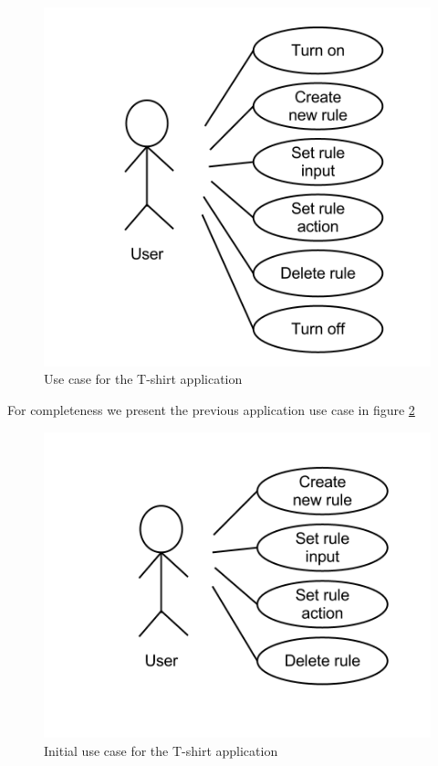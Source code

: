 \begin{figure}[h!]
	\centering \includegraphics[scale=0.35]{img/design-tshirtappusecase2}
	\caption{Use case for the T-shirt application}
	\label{fig:design-tshirtappusecase2}
\end{figure}

For completeness we present the previous application use case in figure \ref{fig:design-tshirtappusecase1}

\begin{figure}[h!]
	\centering \includegraphics[scale=0.35]{img/design-tshirtappusecase1}
	\caption{Initial use case for the T-shirt application}
	\label{fig:design-tshirtappusecase1}
\end{figure}

